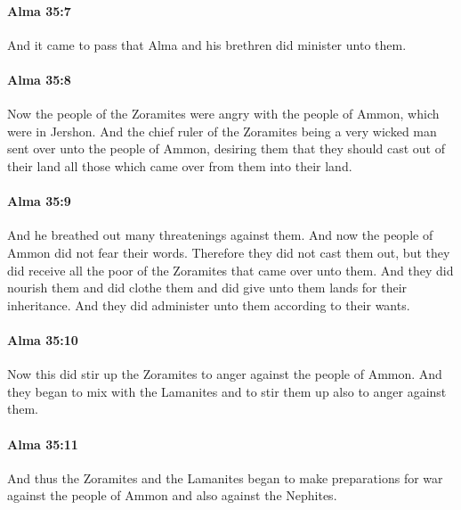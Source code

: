 		\paragraph{Alma 35:7} %
			\label{ALMA-35-7}

			And it came to pass that Alma and his brethren did minister unto them.

		\paragraph{Alma 35:8} %
			\label{ALMA-35-8}

			Now the people of the Zoramites were angry
			with the people of Ammon, which were in Jershon.
			And the chief ruler of the Zoramites being a very wicked man
			sent over unto the people of Ammon,
			desiring them that they should cast out of their land
			all those which came over from them into their land.

		\paragraph{Alma 35:9} %
			\label{ALMA-35-9}

			And he breathed out many threatenings against them.
			And now the people of Ammon did not fear their words.
			Therefore they did not cast them out,
			but they did receive all the poor of the Zoramites that came over unto them.
			And they did nourish them and did clothe them
			and did give unto them lands for their inheritance.
			And they did administer unto them according to their wants.

		\paragraph{Alma 35:10} %
			\label{ALMA-35-10}

			Now this did stir up the Zoramites to anger against the people of Ammon.
			And they began to mix with the Lamanites
			and to stir them up also to anger against them.

		\paragraph{Alma 35:11} %
			\label{ALMA-35-11}

			And thus the Zoramites and the Lamanites began to make preparations for war
			against the people of Ammon and also against the Nephites.

